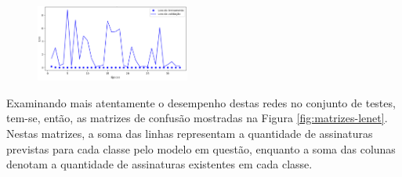 \begin{figure}[h!]
{	\includegraphics[width=0.45\textwidth]{imgs/lenet-adam-loss}
	}
	\label{fig:treinamento-lenet}
\end{figure}

Examinando mais atentamente o desempenho destas redes no conjunto de testes, tem-se, então, as matrizes de confusão mostradas na Figura \ref{fig:matrizes-lenet}. Nestas matrizes, a soma das linhas representam a quantidade de assinaturas previstas para cada classe pelo modelo em questão, enquanto a soma das colunas denotam a quantidade de assinaturas existentes em cada classe.

